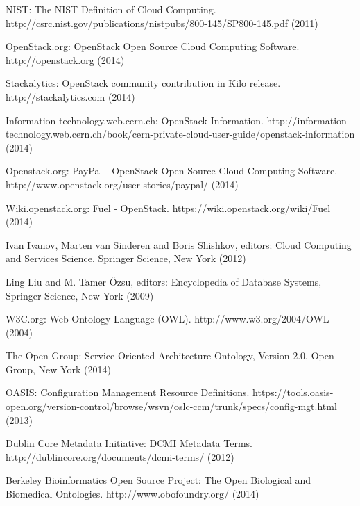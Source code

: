 


\newblock NIST: The NIST Definition of Cloud Computing. http://csrc.nist.gov/publications/nistpubs/800-145/SP800-145.pdf (2011)

\newblock OpenStack.org: OpenStack Open Source Cloud Computing Software. http://openstack.org (2014)

\newblock Stackalytics: OpenStack community contribution in Kilo release. http://stackalytics.com (2014)

\newblock Information-technology.web.cern.ch: OpenStack Information. http://information-technology.web.cern.ch/book/cern-private-cloud-user-guide/openstack-information (2014)

\newblock Openstack.org: PayPal - OpenStack Open Source Cloud Computing Software. http://www.openstack.org/user-stories/paypal/ (2014)

\newblock Wiki.openstack.org: Fuel - OpenStack. https://wiki.openstack.org/wiki/Fuel (2014)

\newblock Ivan Ivanov, Marten van Sinderen and Boris Shishkov, editors: Cloud Computing and Services Science. Springer Science, New York (2012)


\newblock Ling Liu and M. Tamer Özsu, editors: Encyclopedia of Database Systems, Springer Science, New York (2009)

\newblock W3C.org: Web Ontology Language (OWL). http://www.w3.org/2004/OWL (2004)

\newblock The Open Group: Service-Oriented Architecture Ontology, Version 2.0, Open Group, New York (2014)

\newblock OASIS: Configuration Management Resource Definitions. https://tools.oasis-open.org/version-control/browse/wsvn/oslc-ccm/trunk/specs/config-mgt.html (2013)

\newblock Dublin Core Metadata Initiative: DCMI Metadata Terms. http://dublincore.org/documents/dcmi-terms/ (2012)

\newblock Berkeley Bioinformatics Open Source Project: The Open Biological and Biomedical Ontologies.  http://www.obofoundry.org/ (2014)

